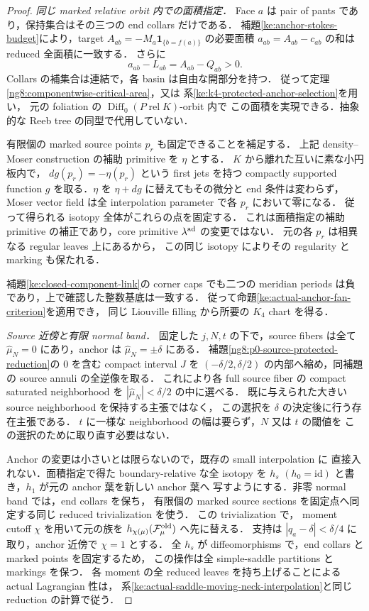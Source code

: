 \begin{proof}
\emph{同じ marked relative orbit 内での面積指定．}
Face $a$ は pair of pants であり，保持集合はその三つの end collars だけである．
補題\ref{ke:anchor-stokes-budget}により，target
$A_{ab}=-M_a\mathbf1_{\{b=f(a)\}}$ の必要面積
$a_{ab}=A_{ab}-c_{ab}$ の和は reduced 全面積に一致する．
さらに
\[
 a_{ab}-L_{ab}=A_{ab}-Q_{ab}>0 .
\]
Collars の補集合は連結で，各 basin は自由な開部分を持つ．
従って定理\ref{ng8:componentwise-critical-area}，又は
系\ref{ke:k4-protected-anchor-selection}を用い，
元の foliation の $\operatorname{Diff}_0(P\operatorname{ rel}K)$-orbit 内で
この面積を実現できる．抽象的な Reeb tree の同型で代用していない．

有限個の marked source points $p_r$ も固定できることを補足する．
上記 density--Moser construction の補助 primitive を $\eta$ とする．
$K$ から離れた互いに素な小円板内で，
$dg(p_r)=-\eta(p_r)$ という first jets を持つ compactly supported function
$g$ を取る．$\eta$ を $\eta+dg$ に替えてもその微分と end 条件は変わらず，
Moser vector field は全 interpolation parameter で各 $p_r$ において零になる．
従って得られる isotopy 全体がこれらの点を固定する．
これは面積指定の補助 primitive の補正であり，core primitive
$\lambda^{\rm ad}$ の変更ではない．
元の各 $p_r$ は相異なる regular leaves 上にあるから，
この同じ isotopy によりその regularity と marking も保たれる．

補題\ref{ke:closed-component-link}の corner caps でも二つの
meridian periods は負であり，上で確認した整数基底は一致する．
従って命題\ref{ke:actual-anchor-fan-criterion}を適用でき，
同じ Liouville filling から所要の $K_4$ chart を得る．

\emph{Source 近傍と有限 normal band．}
固定した $j,N,t$ の下で，source fibers は全て
$\widehat\mu_N=0$ にあり，anchor は
$\widehat\mu_N=\pm\delta$ にある．
補題\ref{ng8:p0-source-protected-reduction}の $0$ を含む compact interval $J$
を $(-\delta/2,\delta/2)$ の内部へ縮め，同補題の source annuli の全逆像を取る．
これにより各 full source fiber の compact saturated neighborhood を
$|\widehat\mu_N|<\delta/2$ の中に選べる．
既に与えられた大きい source neighborhood を保持する主張ではなく，
この選択を $\delta$ の決定後に行う存在主張である．
$t$ に一様な neighborhood の幅は要らず，$N$ 又は $t$ の閾値を
この選択のために取り直す必要はない．

Anchor の変更は小さいとは限らないので，既存の small interpolation に
直接入れない．面積指定で得た boundary-relative な全 isotopy を $h_s$
$(h_0=\mathrm{id})$ と書き，$h_1$ が元の anchor 葉を新しい anchor 葉へ
写すようにする．非零 normal band では，end collars を保ち，
有限個の marked source sections を固定点へ同定する同じ reduced trivialization を使う．
この trivialization で，
moment cutoff $\chi$ を用いて元の族を
$h_{\chi(\mu)}(\mathcal F^{\rm old}_\mu)$ へ先に替える．
支持は $|q_a-\delta|<\delta/4$ に取り，anchor 近傍で $\chi=1$ とする．
全 $h_s$ が diffeomorphisms で，end collars と marked points を固定するため，
この操作は全 simple-saddle partitions と markings を保つ．
各 moment の全 reduced leaves を持ち上げることによる actual Lagrangian 性は，
系\ref{ke:actual-saddle-moving-neck-interpolation}と同じ reduction の計算で従う．


\end{proof}
